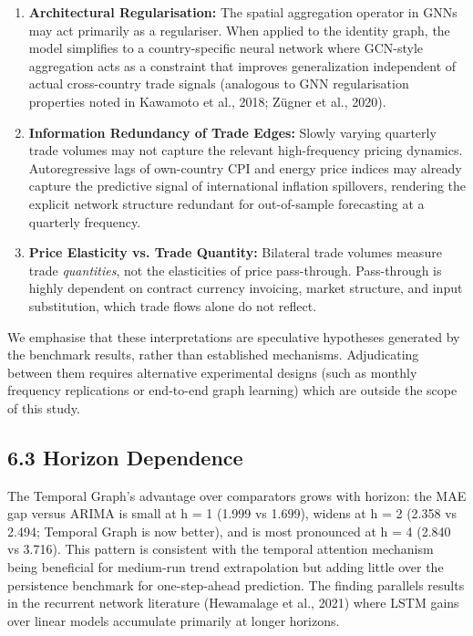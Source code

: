 \documentclass[
]{article}
\begin{document}
\begin{enumerate}
\item \textbf{Architectural Regularisation:} The spatial aggregation operator in GNNs may act primarily as a regulariser. When applied to the identity graph, the model simplifies to a country-specific neural network where GCN-style aggregation acts as a constraint that improves generalization independent of actual cross-country trade signals (analogous to GNN regularisation properties noted in Kawamoto et al., 2018; Zügner et al., 2020).
\item \textbf{Information Redundancy of Trade Edges:} Slowly varying quarterly trade volumes may not capture the relevant high-frequency pricing dynamics. Autoregressive lags of own-country CPI and energy price indices may already capture the predictive signal of international inflation spillovers, rendering the explicit network structure redundant for out-of-sample forecasting at a quarterly frequency.
\item \textbf{Price Elasticity vs. Trade Quantity:} Bilateral trade volumes measure trade \emph{quantities}, not the elasticities of price pass-through. Pass-through is highly dependent on contract currency invoicing, market structure, and input substitution, which trade flows alone do not reflect.
\end{enumerate}

We emphasise that these interpretations are speculative hypotheses generated by the benchmark results, rather than established mechanisms. Adjudicating between them requires alternative experimental designs (such as monthly frequency replications or end-to-end graph learning) which are outside the scope of this study.


\subsection{6.3 Horizon Dependence}\label{horizon-dependence}

The Temporal Graph's advantage over comparators grows with horizon: the
MAE gap versus ARIMA is small at h = 1 (1.999 vs 1.699), widens at h = 2
(2.358 vs 2.494; Temporal Graph is now better), and is most pronounced
at h = 4 (2.840 vs 3.716). This pattern is consistent with the temporal
attention mechanism being beneficial for medium-run trend extrapolation
but adding little over the persistence benchmark for one-step-ahead
prediction. The finding parallels results in the recurrent network
literature (Hewamalage et al., 2021) where LSTM gains over linear models
accumulate primarily at longer horizons.
\end{document}
